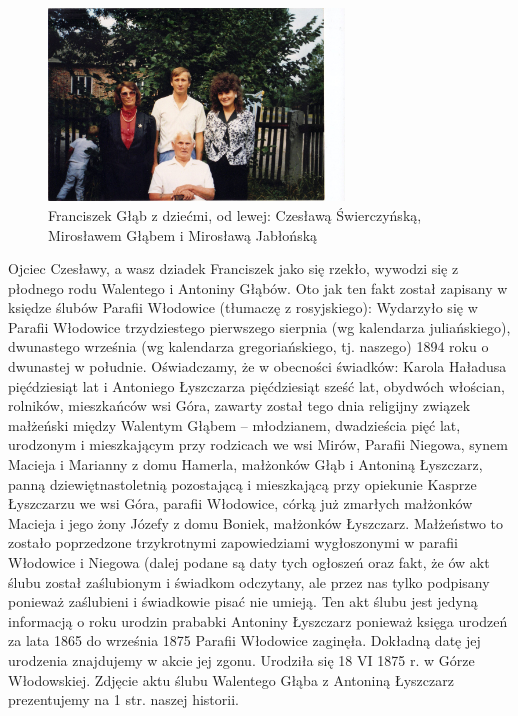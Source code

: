\begin{figure}[!h]
\begin{center}
\includegraphics[width=0.7\textwidth]{zdjecia/franciszek_glab_z_dziecmi.jpg}
\caption[Franciszek Głąb z dziećmi]{Franciszek Głąb z dziećmi, od lewej: Czesławą Świerczyńską, Mirosławem Głąbem i Mirosławą Jabłońską}
\label{rys:franciszek_glab_z_dziecmi}
\end{center}
\end{figure}

Ojciec Czesławy, a wasz dziadek Franciszek jako się rzekło, wywodzi się z płodnego rodu Walentego i Antoniny Głąbów. Oto jak ten fakt został zapisany w księdze ślubów Parafii Włodowice (tłumaczę z rosyjskiego): Wydarzyło się w Parafii Włodowice trzydziestego pierwszego sierpnia (wg kalendarza juliańskiego), dwunastego września (wg kalendarza gregoriańskiego, tj. naszego) 1894 roku o dwunastej w południe. Oświadczamy, że w obecności świadków: Karola Haładusa pięćdziesiąt lat i Antoniego Łyszczarza pięćdziesiąt sześć lat, obydwóch włościan, rolników, mieszkańców wsi Góra, zawarty został tego dnia religijny związek małżeński między Walentym Głąbem – młodzianem, dwadzieścia pięć lat, urodzonym i mieszkającym przy rodzicach we wsi Mirów, Parafii Niegowa, synem Macieja i Marianny z domu Hamerla, małżonków Głąb i Antoniną Łyszczarz, panną dziewiętnastoletnią pozostającą i mieszkającą przy opiekunie Kasprze Łyszczarzu we wsi Góra, parafii Włodowice, córką już zmarłych małżonków Macieja i jego żony Józefy z domu Boniek, małżonków Łyszczarz. Małżeństwo to zostało poprzedzone trzykrotnymi zapowiedziami wygłoszonymi w parafii Włodowice i Niegowa (dalej podane są daty tych ogłoszeń oraz fakt, że ów akt ślubu został zaślubionym i świadkom odczytany, ale przez nas tylko podpisany ponieważ zaślubieni i świadkowie pisać nie umieją. Ten akt ślubu jest jedyną informacją o roku urodzin prababki Antoniny Łyszczarz ponieważ księga urodzeń za lata 1865 do września 1875 Parafii Włodowice zaginęła. Dokładną datę jej urodzenia znajdujemy w akcie jej zgonu. Urodziła się 18 VI 1875 r. w Górze Włodowskiej. Zdjęcie aktu ślubu Walentego Głąba z Antoniną Łyszczarz prezentujemy na 1 str. naszej historii.


